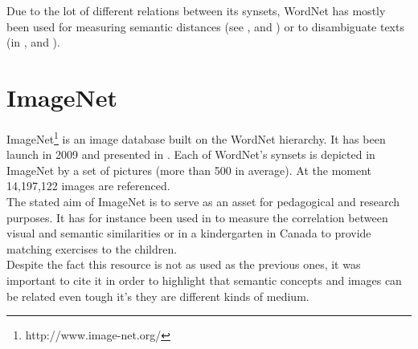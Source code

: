 Due to the lot of different relations between its synsets, WordNet has mostly been used for measuring semantic distances (see \cite{budanitsky2001semantic}, \cite{richardson1994using} and \cite{agirre2009study}) or to disambiguate texts (in \cite{resnik1995disambiguating}, \cite{voorhees1993using} and \cite{banerjee2002adapted}).\\

\section{ImageNet} %
\label{sec:imagenet}

ImageNet\footnote{http://www.image-net.org/} is an image database built on the WordNet hierarchy. It has been launch in 2009 and presented in \cite{deng2009imagenet}. Each of WordNet's synsets is depicted in ImageNet by a set of pictures (more than 500 in average). At the moment 14,197,122 images are referenced.\\

The stated aim of ImageNet is to serve as an asset for pedagogical and research purposes. It has for instance been used in \cite{deselaers2011visual} to measure the correlation between visual and semantic similarities or in a kindergarten in Canada to provide matching exercises to the children.\\

Despite the fact this resource is not as used as the previous ones, it was important to cite it in order to highlight that semantic concepts and images can be related even tough it's they are different kinds of medium.  
